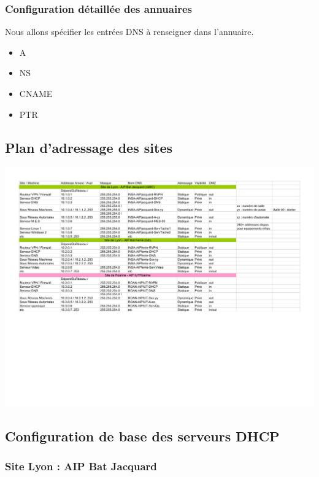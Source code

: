 \documentclass[a4paper]{article}
\begin{document}
\subsubsection{Configuration détaillée des annuaires}

Nous allons spécifier les entrées DNS à renseigner dans l'annuaire.

\begin{itemize}
\item A
\item NS
\item CNAME
\item PTR 
\end{itemize}

\subsection{Plan d'adressage des sites}

\begin{center}
\includegraphics[scale=1.0]{Adressage.pdf}
\end{center}
 
\subsection{Configuration de base des serveurs DHCP}

\subsubsection{Site Lyon : AIP Bat Jacquard }
\end{document}

